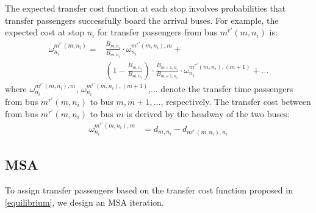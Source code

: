 \documentclass[smallextended]{svjour3}       %
\begin{document}
\begin{Abstract}
The expected transfer cost function at each stop involves probabilities that transfer passengers successfully board the arrival buses.
For example, the expected cost at stop $n_{i}$ for transfer passengers from bus $m^{r'}(m,n_{i})$ is:
\begin{equation}
    \label{equ:omega}
    \begin{split}
        \omega_{n_i}^{m^{r'}(m,n_{i})} = &\frac{\overline{B}_{m,n_{i}}}{B_{m,n_{i}}}\cdot \omega_{n_i}^{m^{r'}(m,n_{i}),m} +\\
        &\left(1-\frac{\overline{B}_{m,n_{i}}}{B_{m,n_{i}}}\right)\cdot \frac{\overline{B}_{m+1,n_{i}}}{B_{m+1,n_{i}}}\cdot \omega_{n_i}^{m^{r'}(m,n_{i}),(m+1)}
        + ...        
    \end{split}
\end{equation}
where $\omega_{n_i}^{m^{r'}(m,n_{i}),m}$, $\omega_{n_i}^{m^{r'}(m,n_{i}),(m+1)}$,... 
denote the transfer time passengers from bus $m^{r'}(m,n_{i})$ to bus $m,m+1,...$, respectively.
The transfer cost between from bus $m^{r'}(m,n_{i})$ to bus $m$ is derived by the headway of the two buses:
\begin{equation}
    \begin{split}
        \omega_{n_{i}}^{m^{r'}(m,n_{i}),m}&=d_{m,n_{i}}-d_{m^{r'}(m,n_{i}),n_{i}}
    \end{split}
\end{equation}

\subsection{MSA}\label{algorithms}
To assign transfer passengers based on the transfer cost function proposed in \ref{equilibrium}, we design an MSA iteration.
  

\end{Abstract}
\end{document}

